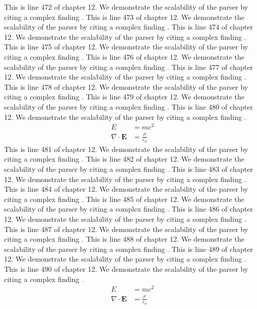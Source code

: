 This is line 472 of chapter 12. We demonstrate the scalability of the parser by citing a complex finding \cite{ref12_472}.
This is line 473 of chapter 12. We demonstrate the scalability of the parser by citing a complex finding \cite{ref12_473}.
This is line 474 of chapter 12. We demonstrate the scalability of the parser by citing a complex finding \cite{ref12_474}.
This is line 475 of chapter 12. We demonstrate the scalability of the parser by citing a complex finding \cite{ref12_475}.
This is line 476 of chapter 12. We demonstrate the scalability of the parser by citing a complex finding \cite{ref12_476}.
This is line 477 of chapter 12. We demonstrate the scalability of the parser by citing a complex finding \cite{ref12_477}.
This is line 478 of chapter 12. We demonstrate the scalability of the parser by citing a complex finding \cite{ref12_478}.
This is line 479 of chapter 12. We demonstrate the scalability of the parser by citing a complex finding \cite{ref12_479}.
This is line 480 of chapter 12. We demonstrate the scalability of the parser by citing a complex finding \cite{ref12_480}.
\begin{align*}
  E &= mc^2 \\
  \nabla \cdot \mathbf{E} &= \frac{\rho}{\varepsilon_0}
\end{align*}
This is line 481 of chapter 12. We demonstrate the scalability of the parser by citing a complex finding \cite{ref12_481}.
This is line 482 of chapter 12. We demonstrate the scalability of the parser by citing a complex finding \cite{ref12_482}.
This is line 483 of chapter 12. We demonstrate the scalability of the parser by citing a complex finding \cite{ref12_483}.
This is line 484 of chapter 12. We demonstrate the scalability of the parser by citing a complex finding \cite{ref12_484}.
This is line 485 of chapter 12. We demonstrate the scalability of the parser by citing a complex finding \cite{ref12_485}.
This is line 486 of chapter 12. We demonstrate the scalability of the parser by citing a complex finding \cite{ref12_486}.
This is line 487 of chapter 12. We demonstrate the scalability of the parser by citing a complex finding \cite{ref12_487}.
This is line 488 of chapter 12. We demonstrate the scalability of the parser by citing a complex finding \cite{ref12_488}.
This is line 489 of chapter 12. We demonstrate the scalability of the parser by citing a complex finding \cite{ref12_489}.
This is line 490 of chapter 12. We demonstrate the scalability of the parser by citing a complex finding \cite{ref12_490}.
\begin{align*}
  E &= mc^2 \\
  \nabla \cdot \mathbf{E} &= \frac{\rho}{\varepsilon_0}
\end{align*}
